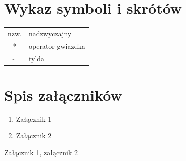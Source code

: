 \documentclass[a4paper,11pt,twoside]{report}
\theoremstyle{definition}
\begin{document}
\chapter*{Wykaz symboli i skrótów}

\begin{tabular}{cl}
nzw. & nadzwyczajny \\
* & operator gwiazdka \\
$\widetilde{}$ & tylda
\end{tabular}
\thispagestyle{empty}


\listoffigures
\thispagestyle{empty}


\renewcommand{\listtablename}{Spis tabel}
\listoftables
\thispagestyle{empty}




\chapter*{Spis załączników}
\begin{enumerate}[itemsep = 0pt]
\item Załącznik 1
\item Załącznik 2
\end{enumerate}
\thispagestyle{empty}


\newpage
\pagestyle{empty} 
Załącznik 1, załącznik 2
\end{document}
